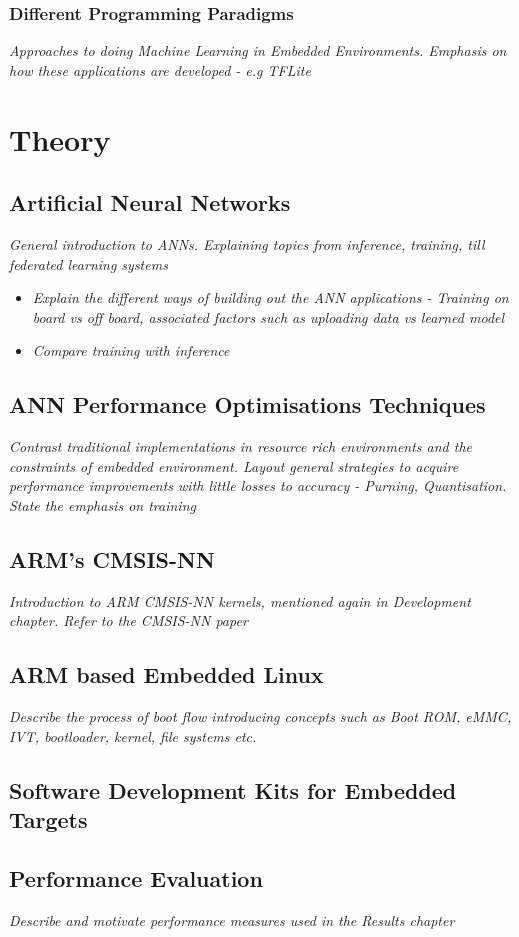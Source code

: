 \subsection{Different Programming Paradigms}
\textit{Approaches to doing Machine Learning in Embedded Environments. Emphasis on how these applications are developed - e.g TFLite}

\chapter{Theory}

\section[Artificial Neural Network (ANN)]{Artificial Neural Networks}
\textit{General introduction to ANNs. Explaining topics from inference, training, till federated learning systems}

\begin{itemize}
	\item \textit{Explain the different ways of building out the ANN applications - Training on board vs off board, associated factors such as uploading data vs learned model}
	\item \textit{Compare training with inference}
\end{itemize}

\section{ANN Performance Optimisations Techniques}
\textit{Contrast traditional implementations in resource rich environments and the constraints of embedded environment. Layout general strategies to acquire performance improvements with little losses to accuracy - Purning, Quantisation. State the emphasis on training}

\section{ARM's CMSIS-NN}
\textit{Introduction to ARM CMSIS-NN kernels, mentioned again in Development chapter. Refer to the CMSIS-NN paper}

\section{ARM based Embedded Linux}
\textit{Describe the process of boot flow introducing concepts such as Boot ROM, eMMC, IVT, bootloader, kernel, file systems etc.}

\section{Software Development Kits for Embedded Targets}

\section{Performance Evaluation}
\textit{Describe and motivate performance measures used in the Results chapter}

